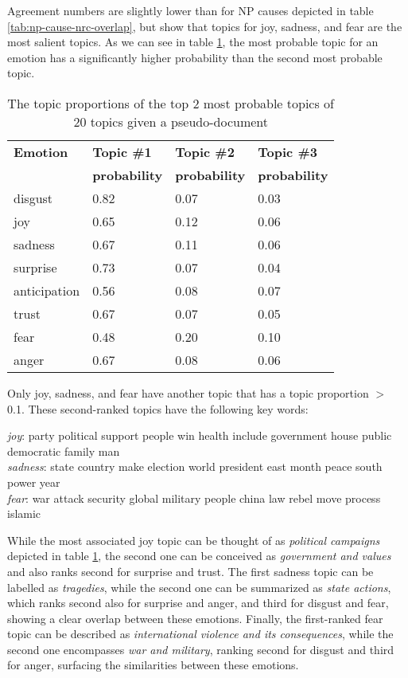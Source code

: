 Agreement numbers are slightly lower than for NP causes depicted in table \ref{tab:np-cause-nrc-overlap}, but show that topics for joy, sadness, and fear are the most salient topics.
As we can see in table \ref{tab:topic-proportions}, the most probable topic for an emotion has a significantly higher probability than the second most probable topic.

\begin{table}[]
\centering
\begin{tabular}{l|l|l|l}
{\bf Emotion} & {\bf Topic \#1} & {\bf Topic \#2} & {\bf Topic \#3}\\
& {\bf probability} & {\bf probability} & {\bf probability}\\\hline
disgust & 0.82 & 0.07 & 0.03\\
joy & 0.65 & 0.12 & 0.06\\
sadness & 0.67 & 0.11 & 0.06\\
surprise & 0.73 & 0.07 & 0.04\\
anticipation & 0.56 & 0.08 & 0.07\\
trust & 0.67 & 0.07 & 0.05\\
fear & 0.48 & 0.20 & 0.10\\
anger & 0.67 & 0.08 & 0.06
\end{tabular}
\caption{The topic proportions of the top 2 most probable topics of 20 topics given a pseudo-document}
\label{tab:topic-proportions}
\end{table}

Only joy, sadness, and fear have another topic that has a topic proportion $>$ 0.1. These second-ranked topics have the following key words:

\textit{joy}: party political support people win health include government house public democratic family man\\
\textit{sadness}: state country make election world president east month peace south power year\\
\textit{fear}: war attack security global military people china law rebel move process islamic

While the most associated joy topic can be thought of as \textit{political campaigns} depicted in table \ref{tab:topic-proportions}, the second one can be conceived as \textit{government and values} and also ranks second for surprise and trust. The first sadness topic can be labelled as \textit{tragedies}, while the second one can be summarized as \textit{state actions}, which ranks second also for surprise and anger, and third for disgust and fear, showing a clear overlap between these emotions. Finally, the first-ranked fear topic can be described as \textit{international violence and its consequences}, while the second one encompasses \textit{war and military}, ranking second for disgust and third for anger, surfacing the similarities between these emotions.

